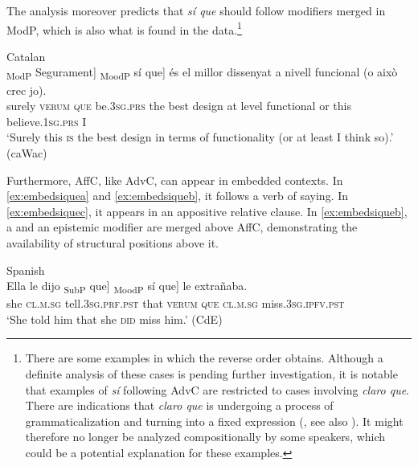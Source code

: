 The analysis moreover predicts that \emph{sí que} should follow modifiers merged in ModP, which is also what is found in the data.\footnote{There are some examples in which the reverse order obtains. Although a definite analysis of these cases is pending further investigation, it  is notable that  examples of \emph{sí}  following AdvC are restricted to cases involving \emph{claro que}. There are indications that  \emph{claro que} is undergoing a process of grammaticalization and turning into a fixed expression (\citealt{Kocher2014,Kocher2018}, see also ). It  might therefore no longer be analyzed compositionally by some speakers, which could be a potential explanation for these examples.}

\ea\label{ex:seguramentsi}
Catalan\\
\gll {\ob}\textsubscript{ModP} Segurament] {\ob}\textsubscript{MoodP} sí que] és el millor dissenyat a nivell funcional (o això crec jo). \\
{} surely {} \textsc{verum} \textsc{que} be.\textsc{3sg.prs} the best design at level functional or this believe.\textsc{1sg.prs} I\\
\glt `Surely this \textsc{is} the best design in terms of functionality (or at least I think so).' (caWac)
\z


Furthermore, AffC, like AdvC, can appear in embedded contexts. In \eqref{ex:embedsiquea} and \eqref{ex:embedsiqueb}, it follows a verb of saying. In \eqref{ex:embedsiquec}, it appears  in an appositive relative clause. In \eqref{ex:embedsiqueb}, a  and an epistemic modifier are merged above AffC,  demonstrating the availability of structural positions above it.\largerpage


\ea
\ea \label{ex:embedsiquea}
		Spanish\\
\gll  Ella le dijo {\ob}\textsubscript{SubP} que]  {\ob}\textsubscript{MoodP} sí que] le extrañaba. \\
		she \textsc{cl.m.sg} tell.\textsc{3sg.prf.pst} {} that {} \textsc{verum} \textsc{que} \textsc{cl.m.sg} miss.\textsc{3sg.ipfv.pst}\\
		\glt `She told him that she \textsc{did} miss him.' (CdE)
		
